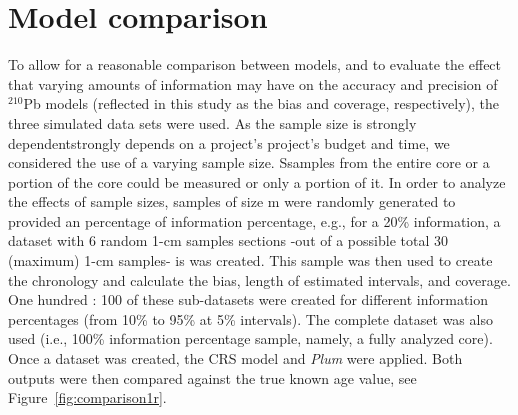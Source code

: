 \documentclass [10pt] {article}
\newcommand{\ac}{\color{red} }  %
\newcommand{\ca}{\color{black}} %
\begin{document}
\section{Model comparison}

To allow for a reasonable comparison between models, and to evaluate the effect that varying amounts of information may have on the accuracy and precision of $^{210}$Pb models (reflected in this study as the bias and coverage, respectively), the three simulated data sets were used. 
As the sample size is strongly dependentstrongly depends on a project’s project's budget and time, we considered the use of a varying sample size. Ssamples from the entire core or a portion of the core could be measured or only a portion of it. In order to analyze the effects of sample sizes, samples of size m were randomly generated to provided an  percentage of information percentage, e.g., for a 20\% information, a dataset with 6 random 1-cm samples sections -out of a possible total 30 (maximum) 1-cm samples- is was created. This sample was then used to create the chronology and calculate the bias, length of estimated intervals, and coverage. One hundred : 100 of these sub-datasets were created for different information percentages (from 10\% to 95\% at 5\% intervals). 
The complete dataset was also used (i.e., 100\% information percentage sample, namely, a fully analyzed core).
Once a dataset was created, the CRS model and \textit{Plum} were applied. %
Both outputs were then compared against the true known age value, see Figure~\ref{fig:comparison1r}.
\end{document}

